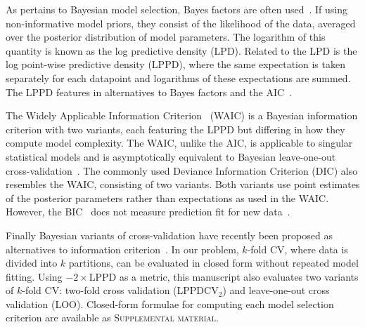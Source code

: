 \documentclass{IOS-Book-Article}
\begin{document}




As pertains to Bayesian model selection,  Bayes factors are often used~\cite{lavine1999bayes,posada2004model}. If using non-informative model priors, they consist of the likelihood of the data, averaged over the posterior distribution of model parameters. The logarithm of this quantity is known as the log predictive density (LPD). Related to the LPD is the log point-wise predictive density (LPPD), where the same expectation is taken separately for each datapoint and logarithms of these expectations are summed. The LPPD features in alternatives to Bayes factors and the AIC~\cite{gelman2014understanding}.

The Widely Applicable Information Criterion~\cite{watanabe2010asymptotic,watanabe2013widely} (WAIC) is a Bayesian information criterion with two variants, each featuring the LPPD but differing in how they compute model complexity.  The WAIC, unlike the AIC, is applicable to singular statistical models and is asymptotically equivalent to Bayesian leave-one-out cross-validation~\cite{watanabe2010asymptotic}. The commonly used Deviance Information Criterion (DIC) also resembles the WAIC,  consisting of two variants. Both variants use point estimates of the posterior parameters rather than expectations as used in the WAIC.
However, the BIC~\cite{narlikar2013one} does not measure prediction fit for new data~\cite{gelman2014understanding}.

Finally Bayesian variants of cross-validation have recently been proposed as alternatives to information criterion~\cite{gelman2014understanding}.  In our problem, $k$-fold CV, where data is divided into $k$ partitions, can be evaluated in closed form without repeated model fitting. Using $-2\times \textrm{LPPD}$ as a metric, this manuscript also evaluates two variants of $k$-fold CV:
two-fold cross validation (LPPDCV$_2$) and leave-one-out cross validation (LOO).  Closed-form formulae for computing each model selection criterion are available as \textsc{Supplemental material}. 
\end{document}

